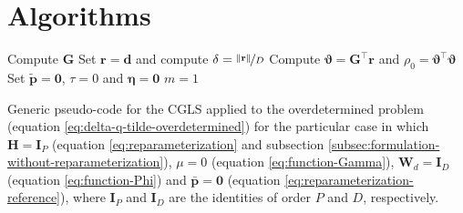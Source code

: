 



%

\section{Algorithms}

\begin{algorithm}
	\Input{}
	Compute $\mathbf{G}$\;
	Set $\mathbf{r} = \mathbf{d}$ and compute $\delta = \nicefrac{\| \mathbf{r} \|}{D}$ \;
	Compute $\boldsymbol{\vartheta} = \mathbf{G}^{\top} \mathbf{r}$ and $\rho_{0} = \boldsymbol{\vartheta}^{\top} \boldsymbol{\vartheta}$ \;
	Set $\tilde{\mathbf{p}} = \mathbf{0}$, $\tau = 0$ and $\boldsymbol{\eta} = \mathbf{0}$ \;
	$m = 1$ \;
	\caption{
		Generic pseudo-code for the CGLS applied to the overdetermined problem (equation \ref{eq:delta-q-tilde-overdetermined})
		for the particular case in which $\mathbf{H} = \mathbf{I}_{P}$ (equation \ref{eq:reparameterization} and 
		subsection \ref{subsec:formulation-without-reparameterization}),
		$\mu = 0$ (equation \ref{eq:function-Gamma}), 
		$\mathbf{W}_{d} = \mathbf{I}_{D}$ (equation \ref{eq:function-Phi}) and
		$\bar{\mathbf{p}} = \mathbf{0}$ (equation \ref{eq:reparameterization-reference}), 
		where $\mathbf{I}_{P}$ and $\mathbf{I}_{D}$ are the identities of order $P$ and $D$, respectively.}
	\label{alg:CGLS}
\end{algorithm}

